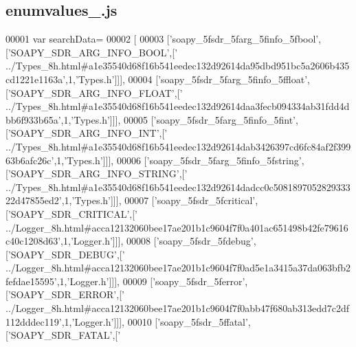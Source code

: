 \subsection{enumvalues\+\_.\+js}
\label{enumvalues__5_8js_source}

\begin{DoxyCode}
00001 var searchData=
00002 [
00003   [\textcolor{stringliteral}{'soapy\_5fsdr\_5farg\_5finfo\_5fbool'},[\textcolor{stringliteral}{'SOAPY\_SDR\_ARG\_INFO\_BOOL'},[\textcolor{stringliteral}{'
      ../Types\_8h.html#a1e35540d68f16b541eedec132d92614da95dbd951bc5a2606b435cd1221e1163a'},1,\textcolor{stringliteral}{'Types.h'}]]],
00004   [\textcolor{stringliteral}{'soapy\_5fsdr\_5farg\_5finfo\_5ffloat'},[\textcolor{stringliteral}{'SOAPY\_SDR\_ARG\_INFO\_FLOAT'},[\textcolor{stringliteral}{'
      ../Types\_8h.html#a1e35540d68f16b541eedec132d92614daa3fecb094334ab31fdd4dbb6f933b65a'},1,\textcolor{stringliteral}{'Types.h'}]]],
00005   [\textcolor{stringliteral}{'soapy\_5fsdr\_5farg\_5finfo\_5fint'},[\textcolor{stringliteral}{'SOAPY\_SDR\_ARG\_INFO\_INT'},[\textcolor{stringliteral}{'
      ../Types\_8h.html#a1e35540d68f16b541eedec132d92614dab3426397cd6fc84af2f39963b6afc26c'},1,\textcolor{stringliteral}{'Types.h'}]]],
00006   [\textcolor{stringliteral}{'soapy\_5fsdr\_5farg\_5finfo\_5fstring'},[\textcolor{stringliteral}{'SOAPY\_SDR\_ARG\_INFO\_STRING'},[\textcolor{stringliteral}{'
      ../Types\_8h.html#a1e35540d68f16b541eedec132d92614dadcc0c508189705282933322d47855ed2'},1,\textcolor{stringliteral}{'Types.h'}]]],
00007   [\textcolor{stringliteral}{'soapy\_5fsdr\_5fcritical'},[\textcolor{stringliteral}{'SOAPY\_SDR\_CRITICAL'},[\textcolor{stringliteral}{'
      ../Logger\_8h.html#acca12132060bee17ae201b1c9604f7f0a401ac651498b42fe79616c40c1208d63'},1,\textcolor{stringliteral}{'Logger.h'}]]],
00008   [\textcolor{stringliteral}{'soapy\_5fsdr\_5fdebug'},[\textcolor{stringliteral}{'SOAPY\_SDR\_DEBUG'},[\textcolor{stringliteral}{'
      ../Logger\_8h.html#acca12132060bee17ae201b1c9604f7f0ad5e1a3415a37da063bfb2fefdae15595'},1,\textcolor{stringliteral}{'Logger.h'}]]],
00009   [\textcolor{stringliteral}{'soapy\_5fsdr\_5ferror'},[\textcolor{stringliteral}{'SOAPY\_SDR\_ERROR'},[\textcolor{stringliteral}{'
      ../Logger\_8h.html#acca12132060bee17ae201b1c9604f7f0abb47f680ab313edd7c2df112dddec119'},1,\textcolor{stringliteral}{'Logger.h'}]]],
00010   [\textcolor{stringliteral}{'soapy\_5fsdr\_5ffatal'},[\textcolor{stringliteral}{'SOAPY\_SDR\_FATAL'},[\textcolor{stringliteral}{'
}
\end{DoxyCode}
